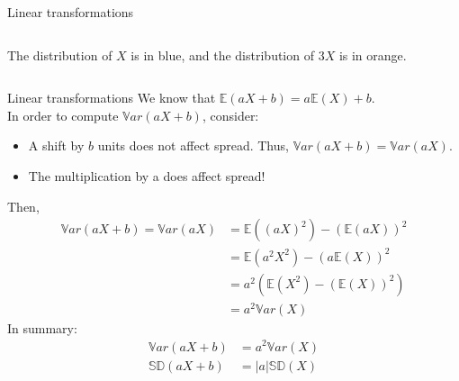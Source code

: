 \documentclass[aspectratio=169]{../latex_main/tntbeamer}  %
\begin{document}
\begin{frame}[c]{Linear transformations}
\begin{columns}
\begin{column}{.5\textwidth}
	                The distribution of $X$ is in blue, and the distribution of $3X$ is in orange. 
	        \end{column}
	    \end{columns}
	\end{frame}
	
	
	\begin{frame}[c]{Linear transformations}
	   We know that $\mathbb{E}(aX + b) = a\mathbb{E}(X) + b$. \\                  
	   In order to compute $\mathbb{V}ar(aX + b)$, consider:
	    \begin{itemize}
	        \item A shift by $b$ units does not affect spread. Thus, $\mathbb{V}ar(aX + b) = \mathbb{V}ar(aX)$.
	        \item The multiplication by a does affect spread!
	    \end{itemize}
	    Then,
	    \begin{align*}
	        \mathbb{V}ar(aX + b) = \mathbb{V}ar(aX) &= \mathbb{E}((aX)^2) - (\mathbb{E}(aX))^2\\
	        &= \mathbb{E}(a^2X^2) - (a\mathbb{E}(X))^2\\
	        &= a^2(\mathbb{E}(X^2) - (\mathbb{E}(X))^2)\\
	        &= a^2\mathbb{V}ar(X)
	    \end{align*}
	    In summary:
	    \begin{align*}
	        \mathbb{V}ar(aX + b) &= a^2\mathbb{V}ar(X)\\
	        \mathbb{SD}(aX + b) &= |a|\mathbb{SD}(X)
	    \end{align*}
	\end{frame}
	
\end{document}
